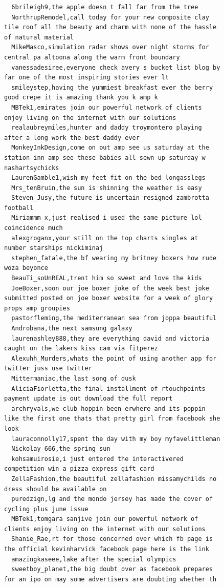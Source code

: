 \begin{figure}[htpb]
\begin{verbatim}
  6brileigh9,the apple doesn t fall far from the tree
  NorthrupRemodel,call today for your new composite clay tile roof all the beauty and charm with none of the hassle of natural material
  MikeMasco,simulation radar shows over night storms for central pa altoona along the warm front boundary
  vanessadesiree,everyone check avery s bucket list blog by far one of the most inspiring stories ever lt
  smileystep,having the yummiest breakfast ever the berry good crepe it is amazing thank you k amp k
  MBTek1,emirates join our powerful network of clients enjoy living on the internet with our solutions
  realaubreymiles,hunter and daddy troymontero playing after a long work the best daddy ever
  MonkeyInkDesign,come on out amp see us saturday at the station inn amp see these babies all sewn up saturday w nashartsychicks
  LaurenGamble1,wish my feet fit on the bed longasslegs
  Mrs_tenBruin,the sun is shinning the weather is easy
  Steven_Jusy,the future is uncertain resigned zambrotta football
  Miriammm_x,just realised i used the same picture lol coincidence much
  alexgroganx,your still on the top charts singles at number starships nickiminaj
  stephen_fatale,the bf wearing my britney boxers how rude woza beyonce
  BeauTi_soUnREAL,trent him so sweet and love the kids
  JoeBoxer,soon our joe boxer joke of the week best joke submitted posted on joe boxer website for a week of glory props amp groupies
  pastorfleming,the mediterranean sea from joppa beautiful
  Androbana,the next samsung galaxy
  laurenashley888,they are everything david and victoria caught on the lakers kiss cam via fitperez
  Alexuhh_Murders,whats the point of using another app for twitter juss use twitter
  Mittermaniac,the last song of dusk
  AliciaFiorletta,the final installment of rtouchpoints payment update is out download the full report
  archryvals,we club hoppin been erwhere and its poppin like the first one thats that pretty girl from facebook she look
  lauraconnolly17,spent the day with my boy myfavelittleman
  Nickolay_666,the spring sun
  kohsamuirosie,i just entered the interactivered competition win a pizza express gift card
  ZellaFashion,the beautiful zellafashion missamychilds no dress should be available on
  puredzign,lg and the mondo jersey has made the cover of cycling plus june issue
  MBTek1,tomgara sanjive join our powerful network of clients enjoy living on the internet with our solutions
  Shanie_Rae,rt for those concerned over which fb page is the official kevinharvick facebook page here is the link
  amazingkaseee,lake after the special olympics
  sweetboy_planet,the big doubt over as facebook prepares for an ipo on may some advertisers are doubting whether th

\end{verbatim}
\end{figure}
